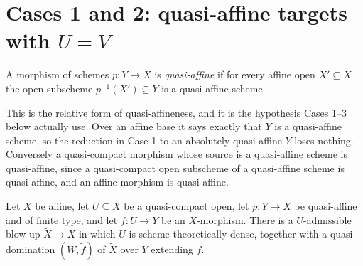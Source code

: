 \section{Cases 1 and 2: quasi-affine targets with $U=V$}

\begin{definition}
  \label{def:nagata-quasi-affine-morphism}
  \leanok

  A morphism of schemes $p\colon Y\to X$ is \emph{quasi-affine} if for every
  affine open $X'\subseteq X$ the open subscheme $p^{-1}(X')\subseteq Y$ is a
  quasi-affine scheme.
\end{definition}

This is the relative form of quasi-affineness, and it is the hypothesis Cases
1--3 below actually use.  Over an affine base it says exactly that $Y$ is a
quasi-affine scheme, so the reduction in Case 1 to an absolutely quasi-affine
$Y$ loses nothing.  Conversely a quasi-compact morphism whose source is a
quasi-affine scheme is quasi-affine, since a quasi-compact open subscheme of a
quasi-affine scheme is quasi-affine, and an affine morphism is quasi-affine.

\begin{lemma}
  \label{lemma:nagata-conrad-quasi-affine-affine-base}
  \leanok

  Let $X$ be affine, let $U\subseteq X$ be a quasi-compact open, let
  $p\colon Y\to X$ be quasi-affine and of finite type, and let $f\colon U\to Y$
  be an $X$-morphism.  There is a $U$-admissible blow-up
  $\widetilde X\to X$ in which $U$ is scheme-theoretically dense, together with
  a quasi-domination $(W,\widetilde f)$ of $\widetilde X$ over $Y$ extending
  $f$.
\end{lemma}

